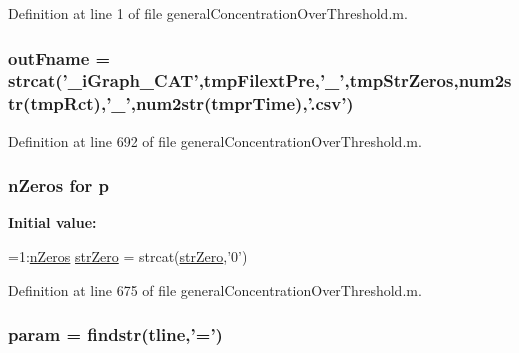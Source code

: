 Definition at line 1 of file general\+Concentration\+Over\+Threshold.\+m.

\hypertarget{a00028_abf4ae8c34e865742e8ee979ed6e03384}{
\subsubsection[{out\+Fname}]{\setlength{\rightskip}{0pt plus 5cm}out\+Fname = strcat('\+\_\+i\+Graph\+\_\+\+C\+A\+T',tmp\+Filext\+Pre,'\+\_\+',{\bf tmp\+Str\+Zeros},num2str(tmp\+Rct),'\+\_\+',num2str(tmpr\+Time),'.csv')}}\label{a00028_abf4ae8c34e865742e8ee979ed6e03384}


Definition at line 692 of file general\+Concentration\+Over\+Threshold.\+m.

\hypertarget{a00028_aa2b4c35904308d35fc5d606a429e608d}{
\subsubsection[{p}]{ {\bf n\+Zeros} for p}}\label{a00028_aa2b4c35904308d35fc5d606a429e608d}
{\bfseries Initial value\+:}
\begin{DoxyCode}
=1:\hyperlink{a00028_ac4353d99277795cadf898255e2c73c71}{nZeros}
            \hyperlink{a00028_a28aa31ca6f19c013204a5cc60a75f0e0}{strZero} = strcat(\hyperlink{a00028_a28aa31ca6f19c013204a5cc60a75f0e0}{strZero},\textcolor{charliteral}{'0'})
\end{DoxyCode}


Definition at line 675 of file general\+Concentration\+Over\+Threshold.\+m.

\hypertarget{a00028_a51f20d6b1b54a2eee3be0e8adc96a0ae}{
\subsubsection[{param}]{\setlength{\rightskip}{0pt plus 5cm}param = findstr({\bf tline},'=')}}\label{a00028_a51f20d6b1b54a2eee3be0e8adc96a0ae}


